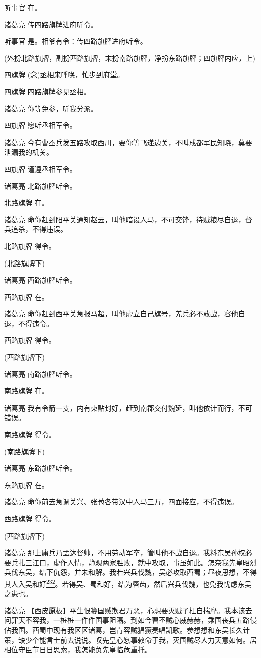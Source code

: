 听事官 在。

诸葛亮 传四路旗牌进府听令。

听事官 是。相爷有令：传四路旗牌进府听令。

(外扮北路旗牌，副扮西路旗牌，末扮南路旗牌，净扮东路旗牌；四旗牌内应，上)

四旗牌 (念)丞相来呼唤，忙步到府堂。

四旗牌 四路旗牌参见丞相。

诸葛亮 你等免参，听我分派。

四旗牌 愿听丞相军令。

诸葛亮
今有曹丕兵发五路攻取西川，要你等飞递边关，不叫成都军民知晓，莫要泄漏我的机关。

四旗牌 谨遵丞相军令。

诸葛亮 北路旗牌听令。

北路旗牌 在。

诸葛亮
命你赶到阳平关通知赵云，叫他暗设人马，不可交锋，待贼粮尽自退，督兵追杀，不得违误。

北路旗牌 得令。

(北路旗牌下)

诸葛亮 西路旗牌听令。

西路旗牌 在。

诸葛亮
命你赶到西平关急报马超，叫他虚立自己旗号，羌兵必不敢战，容他自退，不得违令。

西路旗牌 得令。

(西路旗牌下)

诸葛亮 南路旗牌听令。

南路旗牌 在。

诸葛亮
我有令箭一支，内有柬贴封好，赶到南郡交付魏延，叫他依计而行，不可错误。

南路旗牌 得令。

(南路旗牌下)

诸葛亮 东路旗牌听令。

东路旗牌 在。

诸葛亮 命你前去急调关兴、张苞各带汉中人马三万，四面接应，不得违误。

西路旗牌 得令。

(西路旗牌下)

诸葛亮
那上庸兵乃孟达督帅，不用劳动军卒，管叫他不战自退。我料东吴孙权必要兵扎三江口，虚作人情，静观两家胜败，就中攻取，事虽如此。怎奈我先皇昭烈兵伐东吴，结下仇怨，并未和解。我若兴兵伐魏，吴必攻取西蜀；昼夜思想，不得其人入吴和好\protect\hyperlink{fn232}{\textsuperscript{232}}。若得吴、蜀和好，结为唇齿，然后兴兵伐魏，也免我忧虑东吴之患也。

诸葛亮
【西皮\textbf{原}板】平生恨篡国贼欺君万恶，心想要灭贼子枉自揣摩。我本该去问罪天不容我，一桩桩一件件国事阻隔。到如今曹丕贼心威赫赫，乘国丧兵五路侵佔我国。西蜀中现有我区区诸葛，岂肯容贼猖獗奏唱凯歌。参想想和东吴长久计策，缺少个能言士前去说说。叹先皇心愿事敕命于我，灭国贼尽人力天意如何。居相位守臣节日日思索，我怎能负先皇临危重托。

